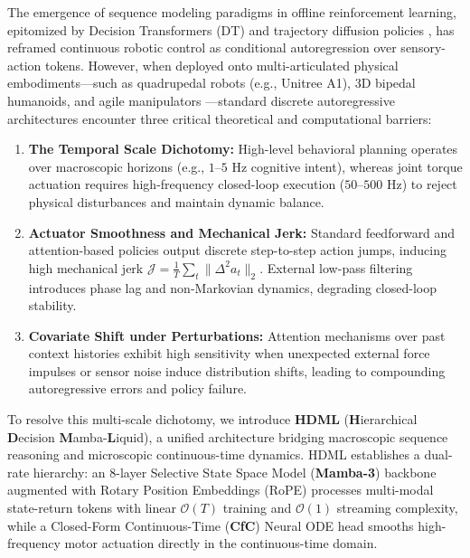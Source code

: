 \documentclass{article}
\begin{document}
The emergence of sequence modeling paradigms in offline reinforcement learning, epitomized by Decision Transformers (DT) \cite{chen2021decision} and trajectory diffusion policies \cite{chi2023diffusion}, has reframed continuous robotic control as conditional autoregression over sensory-action tokens. However, when deployed onto multi-articulated physical embodiments---such as quadrupedal robots (e.g., Unitree A1), 3D bipedal humanoids, and agile manipulators \cite{zhao2023learning, brohan2023rt2}---standard discrete autoregressive architectures encounter three critical theoretical and computational barriers:

\begin{enumerate}
    \item \textbf{The Temporal Scale Dichotomy:} High-level behavioral planning operates over macroscopic horizons (e.g., $1$--$5\text{ Hz}$ cognitive intent), whereas joint torque actuation requires high-frequency closed-loop execution ($50$--$500\text{ Hz}$) to reject physical disturbances and maintain dynamic balance.
    \item \textbf{Actuator Smoothness and Mechanical Jerk:} Standard feedforward and attention-based policies output discrete step-to-step action jumps, inducing high mechanical jerk $\mathcal{J} = \frac{1}{T}\sum_t \|\Delta^2 a_t\|_2$. External low-pass filtering introduces phase lag and non-Markovian dynamics, degrading closed-loop stability.
    \item \textbf{Covariate Shift under Perturbations:} Attention mechanisms over past context histories exhibit high sensitivity when unexpected external force impulses or sensor noise induce distribution shifts, leading to compounding autoregressive errors and policy failure.
\end{enumerate}

To resolve this multi-scale dichotomy, we introduce \textbf{HDML} (\textbf{H}ierarchical \textbf{D}ecision \textbf{M}amba-\textbf{L}iquid), a unified architecture bridging macroscopic sequence reasoning and microscopic continuous-time dynamics. HDML establishes a dual-rate hierarchy: an 8-layer Selective State Space Model (\textbf{Mamba-3}) backbone \cite{gu2023mamba} augmented with Rotary Position Embeddings (RoPE) \cite{su2024roformer} processes multi-modal state-return tokens with linear $\mathcal{O}(T)$ training and $\mathcal{O}(1)$ streaming complexity, while a Closed-Form Continuous-Time (\textbf{CfC}) Neural ODE head \cite{hasani2022closed, lechner2020neural} smooths high-frequency motor actuation directly in the continuous-time domain.
\end{document}
